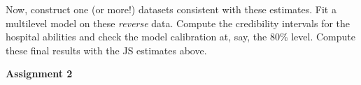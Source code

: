 \begin{itemize}
Now, construct one (or more!) datasets consistent with these estimates. Fit a multilevel model on these \emph{reverse} data.   Compute the credibility intervals for the hospital abilities and check the model calibration at, say, the 80\% level. Compute these final results with the JS estimates above.

\end{itemize}

\vspace{1cm}
\hspace{-0.8cm}
\textbf{Assignment 2}
\vspace{0.5cm}










